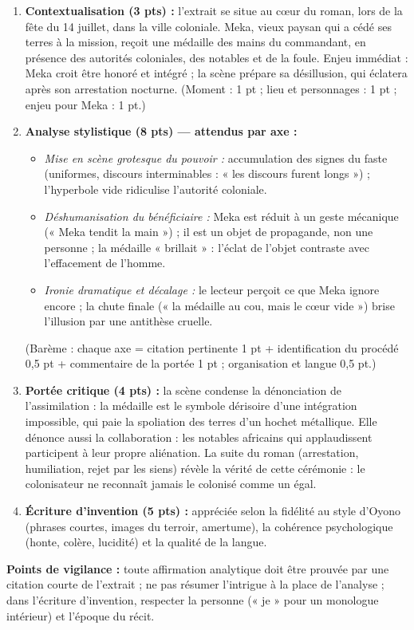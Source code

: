\documentclass[11pt]{article}
\begin{document}
\begin{corrige}
\begin{enumerate}
\item \textbf{Contextualisation (3 pts) :} l'extrait se situe au cœur du roman, lors de la fête du 14 juillet, dans la ville coloniale. Meka, vieux paysan qui a cédé ses terres à la mission, reçoit une médaille des mains du commandant, en présence des autorités coloniales, des notables et de la foule. Enjeu immédiat : Meka croit être honoré et intégré ; la scène prépare sa désillusion, qui éclatera après son arrestation nocturne. (Moment : 1 pt ; lieu et personnages : 1 pt ; enjeu pour Meka : 1 pt.)
\item \textbf{Analyse stylistique (8 pts) — attendus par axe :}
\begin{itemize}
\item \emph{Mise en scène grotesque du pouvoir :} accumulation des signes du faste (uniformes, discours interminables : « les discours furent longs ») ; l'hyperbole vide ridiculise l'autorité coloniale.
\item \emph{Déshumanisation du bénéficiaire :} Meka est réduit à un geste mécanique (« Meka tendit la main ») ; il est un objet de propagande, non une personne ; la médaille « brillait » : l'éclat de l'objet contraste avec l'effacement de l'homme.
\item \emph{Ironie dramatique et décalage :} le lecteur perçoit ce que Meka ignore encore ; la chute finale (« la médaille au cou, mais le cœur vide ») brise l'illusion par une antithèse cruelle.
\end{itemize}
(Barème : chaque axe = citation pertinente 1 pt + identification du procédé 0,5 pt + commentaire de la portée 1 pt ; organisation et langue 0,5 pt.)
\item \textbf{Portée critique (4 pts) :} la scène condense la dénonciation de l'assimilation : la médaille est le symbole dérisoire d'une intégration impossible, qui paie la spoliation des terres d'un hochet métallique. Elle dénonce aussi la collaboration : les notables africains qui applaudissent participent à leur propre aliénation. La suite du roman (arrestation, humiliation, rejet par les siens) révèle la vérité de cette cérémonie : le colonisateur ne reconnaît jamais le colonisé comme un égal.
\item \textbf{Écriture d'invention (5 pts) :} appréciée selon la fidélité au style d'Oyono (phrases courtes, images du terroir, amertume), la cohérence psychologique (honte, colère, lucidité) et la qualité de la langue.
\end{enumerate}
\textbf{Points de vigilance :} toute affirmation analytique doit être prouvée par une citation courte de l'extrait ; ne pas résumer l'intrigue à la place de l'analyse ; dans l'écriture d'invention, respecter la personne (« je » pour un monologue intérieur) et l'époque du récit.
\end{corrige}
\end{document}
